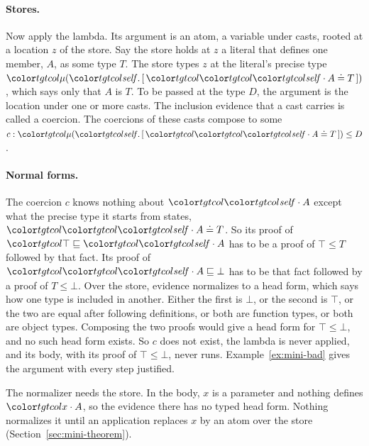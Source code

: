 \paragraph{Stores.}
Now apply the lambda. Its argument is an atom, a variable under casts, rooted at a location $z$ of the store. Say the store holds at $z$ a literal that defines one member, $A$, as some type $T$. The store types $z$ at the literal's precise type $\obj{[\,\peq{\sel{\self}{A}}{T}\,]}$, which says only that $A$ is $T$. To be passed at the type $D$, the argument is the location under one or more casts. The inclusion evidence that a cast carries is called a coercion. The coercions of these casts compose to some $c : \obj{[\,\peq{\sel{\self}{A}}{T}\,]} \le D$.

\paragraph{Normal forms.}
The coercion $c$ knows nothing about $\sel{\self}{A}$ except what the precise type it starts from states, $\peq{\sel{\self}{A}}{T}$. So its proof of $\ple{\top}{\sel{\self}{A}}$ has to be a proof of $\top \le T$ followed by that fact. Its proof of $\ple{\sel{\self}{A}}{\bot}$ has to be that fact followed by a proof of $T \le \bot$. Over the store, evidence normalizes to a head form, which says how one type is included in another. Either the first is $\bot$, or the second is $\top$, or the two are equal after following definitions, or both are function types, or both are object types. Composing the two proofs would give a head form for $\top \le \bot$, and no such head form exists. So $c$ does not exist, the lambda is never applied, and its body, with its proof of $\top \le \bot$, never runs. Example~\ref{ex:mini-bad} gives the argument with every step justified.

The normalizer needs the store. In the body, $x$ is a parameter and nothing defines $\sel{x}{A}$, so the evidence there has no typed head form. Nothing normalizes it until an application replaces $x$ by an atom over the store (Section~\ref{sec:mini-theorem}).

